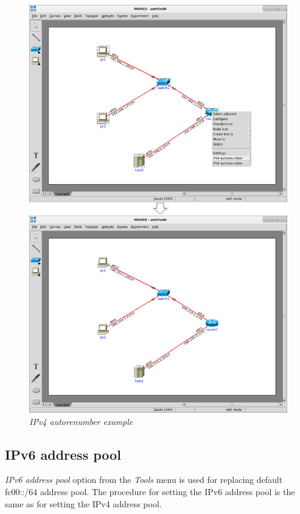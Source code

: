 \begin{figure}[H]
\centering
\vspace{10pt}
\includegraphics[width=\textwidth]{./images/ipv4_autorenumber_example.png}
\caption{\emph{IPv4 autorenumber example}}
\label{fig:ipv4_autorenumber_example}
\end{figure}

\subsection{IPv6 address pool}
\label{sec:IPv6AddressPool}
\emph{IPv6 address pool} option from the \emph{Tools} menu is used for
replacing default fc00::/64 address pool.
The procedure for setting the IPv6 address pool is the same as for setting the IPv4 address pool.

